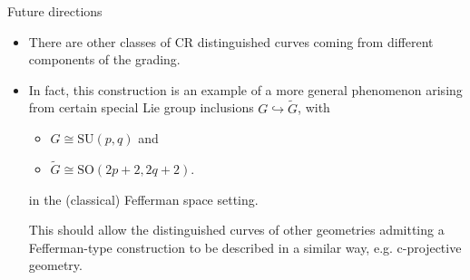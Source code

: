 \documentclass[handout]{beamer}
\begin{document}
\begin{frame}{Future directions}
  \begin{itemize}
    \item There are other classes of CR distinguished curves coming from
      different components of the grading.
    \vfill
    \item In fact, this construction is an example of a more general phenomenon arising
  from certain special Lie group inclusions $G \hookrightarrow \tilde{G}$, with
  \begin{itemize}
    \item $G \cong \mathrm{SU}(p,q)$ and 
    \item $\tilde{G} \cong \mathrm{SO}(2p+2, 2q+2)$.
  \end{itemize}
  in the (classical) Fefferman space setting.

  This should allow the distinguished curves of other geometries admitting a
  Fefferman-type construction to be described in a similar way, e.g. c-projective
  geometry.
  \vfill
  \end{itemize}
\end{frame}
\end{document}
